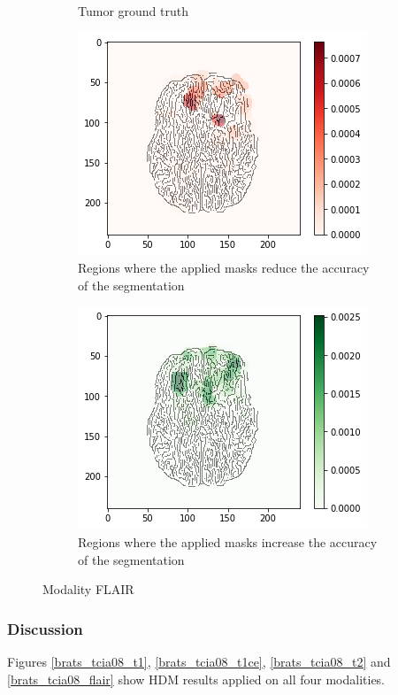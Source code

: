 \begin{figure}[H]
\begin{subfigure}[t]{.4\textwidth}
        \caption{Tumor ground truth}
    \end{subfigure}
    \begin{subfigure}[t]{.45\textwidth}
        \centering
        \includegraphics[width=\linewidth]{chapters/06_hdm/c_Brats18_2013_17_1_L1/58.png}
        \caption{Regions where the applied masks reduce the accuracy of the segmentation}
    \end{subfigure}\hspace{1cm}%
    \begin{subfigure}[t]{.45\textwidth}
        \centering
        \includegraphics[width=\linewidth]{chapters/06_hdm/c_Brats18_2013_17_1_L1/59.png}
        \caption{Regions where the applied masks increase the accuracy of the segmentation}
    \end{subfigure}
    \caption{Modality FLAIR}
    \label{brats_201317_flair}
\end{figure}

\subsubsection{Discussion}
Figures \ref{brats_tcia08_t1}, \ref{brats_tcia08_t1ce}, \ref{brats_tcia08_t2} and \ref{brats_tcia08_flair} show HDM results applied on all four modalities.